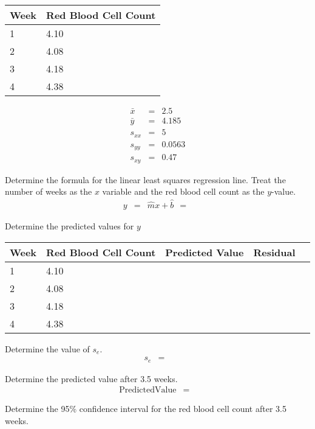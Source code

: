 \begin{problem}
\begin{multicols}{2}
  \begin{tabular}{l|l}
    Week & Red Blood Cell Count \\ \hline
    1 & 4.10 \\
    2 & 4.08 \\
    3 & 4.18 \\
    4 & 4.38
  \end{tabular}
  \columnbreak
  \begin{eqnarray*}
    \bar{x} & = & 2.5 \\
    \bar{y} & = & 4.185 \\
    s_{xx}  & = & 5 \\
    s_{yy}  & = & 0.0563 \\
    s_{xy}  & = & 0.47
  \end{eqnarray*}
\end{multicols}
  
  \begin{subproblem}
  \item Determine the formula for the linear least squares regression
    line. Treat the number of weeks as the $x$ variable and the red
    blood cell count as the $y$-value.
    \begin{eqnarray*}
      y & = & \hat{m} x + \hat{b} ~~ = ~~ 
    \end{eqnarray*}
  \item Determine the predicted values for $y$  \\
    \begin{tabular}{l|l|l|l|l}
      Week & Red Blood Cell Count & Predicted Value & Residual\\ \hline
      1 & 4.10 & & \\
      2 & 4.08 & & \\
      3 & 4.18 & & \\
      4 & 4.38 & & 
    \end{tabular}
  \item Determine the value of $s_e$.
    \begin{eqnarray*}
      s_e & = & 
    \end{eqnarray*}
  \item Determine the predicted value after 3.5 weeks.
    \begin{eqnarray*}
      \mathrm{Predicted Value} & = & 
    \end{eqnarray*}
  \item Determine the 95\% confidence interval for the red blood cell
    count after 3.5 weeks.
    \vfill
  \end{subproblem}


\end{problem}

